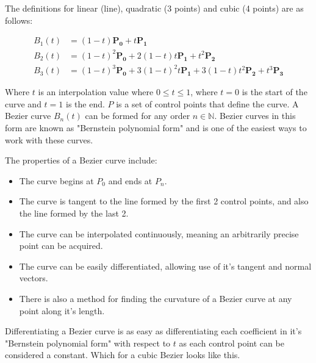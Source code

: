         The definitions for linear (line), quadratic (3 points) and cubic (4 points) are as follows:

        \begin{align*}
            B_1(t) &= (1 - t)\mathbf{P_0} + t\mathbf{P_1}\\
            B_2(t) &= (1 - t)^2\mathbf{P_0} + 2(1 - t)t\mathbf{P_1} + t^2\mathbf{P_2}\\
            B_3(t) &= (1 - t)^3\mathbf{P_0} + 3(1 - t)^2t\mathbf{P_1} + 3(1 - t)t^2\mathbf{P_2} + t^3\mathbf{P_3}
        \end{align*}

        Where $t$ is an interpolation value where $0 \leq t \leq 1$, where $t=0$ is the start of the curve and $t=1$ is the end. $P$ is a set of control points that define the curve. A Bezier curve $B_n(t)$ can be formed for any order $n \in \mathbb{N}$. Bezier curves in this form are known as "Bernstein polynomial form" and is one of the easiest ways to work with these curves.

        The properties of a Bezier curve include:
        \begin{itemize}
            \item The curve begins at $P_0$ and ends at $P_n$.
            \item The curve is tangent to the line formed by the first 2 control points, and also the line formed by the last 2.
            \item The curve can be interpolated continuously, meaning an arbitrarily precise point can be acquired.
            \item The curve can be easily differentiated, allowing use of it's tangent and normal vectors.
            \item There is also a method for finding the curvature of a Bezier curve at any point along it's length.
        \end{itemize}

        Differentiating a Bezier curve is as easy as differentiating each coefficient in it's "Bernstein polynomial form" with respect to $t$ as each control point can be considered a constant. Which for a cubic Bezier looks like this.

